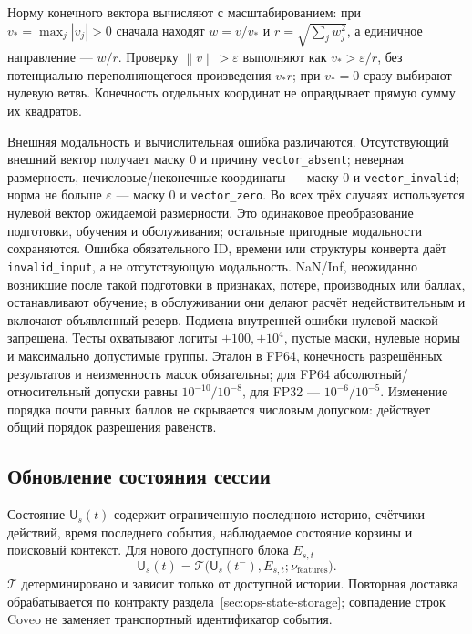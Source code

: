\documentclass[12pt,a4paper]{article}
\newcommand{\code}[1]{{\ttfamily\small\nolinkurl{#1}}}
\newcommand{\eps}{\varepsilon}
\newcommand{\norm}[1]{\left\lVert#1\right\rVert}
\theoremstyle{plainru}
\begin{document}
Норму конечного вектора вычисляют с масштабированием: при
$v_*=\max_j|v_j|>0$ сначала находят $w=v/v_*$ и $r=\sqrt{\sum_jw_j^2}$,
а единичное направление --- $w/r$. Проверку $\norm v>\eps$
выполняют как $v_*>\eps/r$, без потенциально переполняющегося
произведения $v_*r$; при $v_*=0$ сразу выбирают нулевую ветвь.
Конечность отдельных координат не оправдывает прямую сумму их квадратов.

Внешняя модальность и вычислительная ошибка различаются.
Отсутствующий внешний вектор получает маску 0 и причину
\code{vector_absent}; неверная размерность, нечисловые/неконечные
координаты --- маску 0 и \code{vector_invalid}; норма не больше
$\eps$ --- маску 0 и \code{vector_zero}. Во всех трёх случаях
используется нулевой вектор ожидаемой размерности. Это одинаковое
преобразование подготовки, обучения и обслуживания; остальные пригодные
модальности сохраняются. Ошибка обязательного ID, времени или структуры
конверта даёт \code{invalid_input}, а не отсутствующую модальность.
NaN/Inf, неожиданно возникшие после такой подготовки в признаках,
потере, производных или баллах, останавливают обучение; в обслуживании
они делают расчёт недействительным и включают объявленный резерв.
Подмена внутренней ошибки нулевой маской запрещена.
Тесты охватывают логиты $\pm100,\pm10^4$, пустые маски,
нулевые нормы и максимально допустимые группы. Эталон в FP64,
конечность разрешённых результатов и неизменность масок обязательны;
для FP64 абсолютный/относительный допуски равны $10^{-10}/10^{-8}$,
для FP32 --- $10^{-6}/10^{-5}$. Изменение порядка почти равных
баллов не скрывается числовым допуском: действует общий порядок разрешения равенств.

\subsection{Обновление состояния сессии}

Состояние \(\mathsf U_s(t)\) содержит ограниченную последнюю историю,
счётчики действий, время последнего события, наблюдаемое состояние
корзины и поисковый контекст. Для нового доступного блока \(E_{s,t}\)
\begin{equation}\label{eq:ops-state-update}
\mathsf U_s(t)=\mathcal T\bigl(\mathsf U_s(t^-),E_{s,t};\nu_{\mathrm{features}}\bigr).
\end{equation}
\(\mathcal T\) детерминировано и зависит только от доступной истории.
Повторная доставка обрабатывается по контракту
раздела~\ref{sec:ops-state-storage}; совпадение строк Coveo
не заменяет транспортный идентификатор события.
\end{document}
